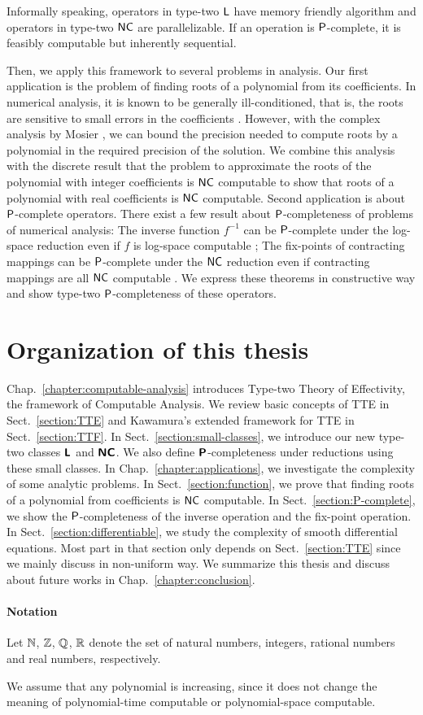 Informally speaking, operators in type-two $\mathsf{L}$ have
memory friendly algorithm and operators in type-two $\mathsf{NC}$
are parallelizable.
If an operation is $\mathsf{P}$-complete,
it is feasibly computable but inherently sequential. 

Then, we apply this framework to several problems in analysis.
Our first application is the problem of finding roots of a polynomial 
from its coefficients.
In numerical analysis, it is known to be generally ill-conditioned, 
that is, the roots are sensitive to 
small errors in the coefficients \cite{wilkinson1963rounding}.
However, with the complex analysis by Mosier \cite{mosier1986root},
we can bound the precision needed to compute
roots by a polynomial in the required precision of the solution.
We combine this analysis with the discrete result 
that the problem to approximate the roots of the polynomial with integer 
coefficients is $\mathsf{NC}$ computable \cite{neff1994specified}
to show that roots of a polynomial with real coefficients
is $\mathsf{NC}$ computable.
Second application is about $\mathsf{P}$-complete operators.
There exist a few result about $\mathsf{P}$-completeness of problems of numerical analysis:
The inverse function $f^{-1}$ can be $\mathsf{P}$-complete under the log-space
reduction even if $f$ is log-space computable \cite{ko1983computational};
The fix-points of contracting mappings can be $\mathsf{P}$-complete under the
$\mathsf{NC}$ reduction even if contracting mappings are all $\mathsf{NC}$ computable \cite{hoover1991real}.
We express these theorems in constructive way and
show type-two $\mathsf{P}$-completeness of these operators.




\section{Organization of this thesis}
Chap.~\ref{chapter:computable-analysis} introduces Type-two Theory of Effectivity, the framework of Computable Analysis.
We review basic concepts of TTE in Sect.~\ref{section:TTE} and
Kawamura's extended framework for TTE in Sect.~\ref{section:TTF}.
In Sect.~\ref{section:small-classes}, we introduce our new type-two classes
$\text{\bfseries \sffamily \upshape L}$ and $\text{\bfseries \sffamily \upshape NC}$.
We also define $\text{\bfseries \sffamily \upshape P}$-completeness under reductions using these small classes.
In Chap.~\ref{chapter:applications}, we investigate the complexity of some analytic problems.
In Sect.~\ref{section:function}, we prove that finding roots of a polynomial 
from coefficients is $\mathsf{NC}$ computable.
In Sect.~\ref{section:P-complete}, we show the $\mathsf{P}$-completeness of 
the inverse operation and the fix-point operation.
In Sect.~\ref{section:differentiable}, we study the complexity of
smooth differential equations.
Most part in that section only depends on Sect.~\ref{section:TTE}
since we mainly discuss in non-uniform way.
We summarize this thesis and discuss about future works in Chap.~\ref{chapter:conclusion}.


\paragraph{Notation}
Let $\mathbb N$, $\mathbb Z$, $\mathbb Q$, $\mathbb R$ denote the set of natural numbers,
integers,
rational numbers and 
real numbers, respectively.

We assume that any polynomial is increasing,
since it does not change the meaning of 
polynomial-time computable or polynomial-space computable.

